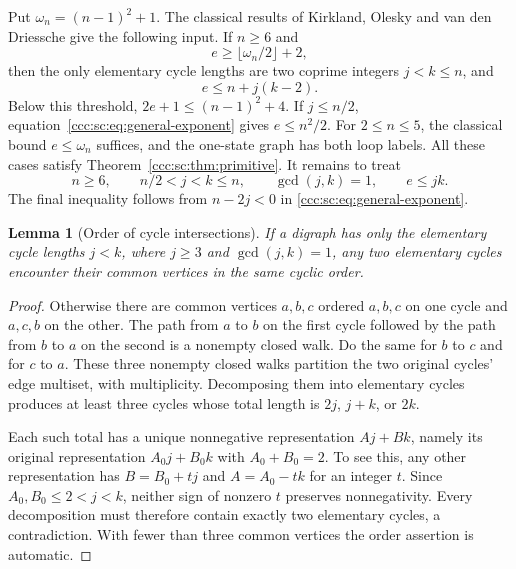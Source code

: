 \documentclass[11pt,letterpaper]{article}
\newtheorem{lemma}[theorem]{Lemma}
\theoremstyle{definition}
\theoremstyle{remark}
\begin{document}
Put $\omega_n=(n-1)^2+1$. The classical results of Kirkland, Olesky and van den Driessche \cite[Theorems~1.1--1.2 and the proof of Theorem~1.2]{KOV} give the following input. If $n\ge6$ and
\begin{equation}\label{ccc:sc:eq:general-threshold}
 e\ge\lfloor\omega_n/2\rfloor+2,
\end{equation}
then the only elementary cycle lengths are two coprime integers $j<k\le n$, and
\begin{equation}\label{ccc:sc:eq:general-exponent}
 e\le n+j(k-2).
\end{equation}
Below this threshold, $2e+1\le(n-1)^2+4$. If $j\le n/2$, equation~\eqref{ccc:sc:eq:general-exponent} gives $e\le n^2/2$. For $2\le n\le5$, the classical bound $e\le\omega_n$ suffices, and the one-state graph has both loop labels. All these cases satisfy Theorem~\ref{ccc:sc:thm:primitive}. It remains to treat
\begin{equation}\label{ccc:sc:eq:longcycles}
 n\ge6,\qquad n/2<j<k\le n,\qquad \gcd(j,k)=1,\qquad e\le jk.
\end{equation}
The final inequality follows from $n-2j<0$ in \eqref{ccc:sc:eq:general-exponent}.

\begin{lemma}[Order of cycle intersections]\label{ccc:sc:lem:order}
If a digraph has only the elementary cycle lengths $j<k$, where $j\ge3$ and $\gcd(j,k)=1$, any two elementary cycles encounter their common vertices in the same cyclic order.
\end{lemma}
\begin{proof}
Otherwise there are common vertices $a,b,c$ ordered $a,b,c$ on one cycle and $a,c,b$ on the other. The path from $a$ to $b$ on the first cycle followed by the path from $b$ to $a$ on the second is a nonempty closed walk. Do the same for $b$ to $c$ and for $c$ to $a$. These three nonempty closed walks partition the two original cycles' edge multiset, with multiplicity. Decomposing them into elementary cycles produces at least three cycles whose total length is $2j$, $j+k$, or $2k$.

Each such total has a unique nonnegative representation $Aj+Bk$, namely its original representation $A_0j+B_0k$ with $A_0+B_0=2$. To see this, any other representation has $B=B_0+t j$ and $A=A_0-t k$ for an integer $t$. Since $A_0,B_0\le2<j<k$, neither sign of nonzero $t$ preserves nonnegativity. Every decomposition must therefore contain exactly two elementary cycles, a contradiction. With fewer than three common vertices the order assertion is automatic.
\end{proof}
\end{document}
